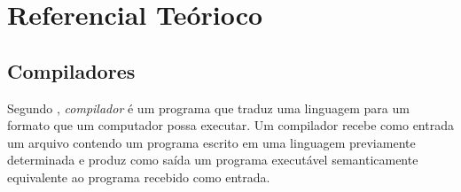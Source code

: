 \section{Referencial Teórioco}
\subsection{Compiladores}
Segundo , \emph{compilador} é um programa que traduz uma
linguagem para um formato que um computador possa executar. Um compilador recebe
como entrada um arquivo contendo um programa escrito em uma linguagem previamente
determinada e produz como saída um programa executável semanticamente equivalente
ao programa recebido como entrada.

